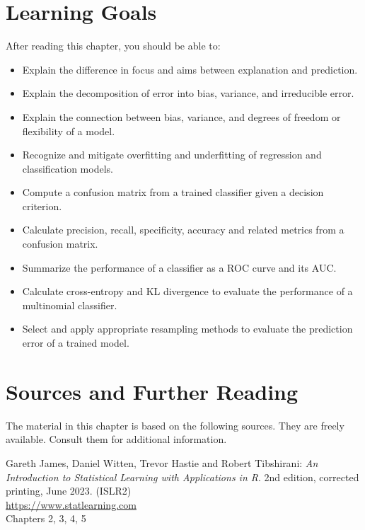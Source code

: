 %
%
\section*{Learning Goals}

After reading this chapter, you should be able to:
\begin{itemize}
   \item Explain the difference in focus and aims between explanation and prediction.
   \item Explain the decomposition of error into bias, variance, and irreducible error.
   \item Explain the connection between bias, variance, and degrees of freedom or flexibility of a model.
   \item Recognize and mitigate overfitting and underfitting of regression and classification models.
   \item Compute a confusion matrix from a trained classifier given a decision criterion.
   \item Calculate precision, recall, specificity, accuracy and related metrics from a confusion matrix.
   \item Summarize the performance of a classifier as a ROC curve and its AUC.
   \item Calculate cross-entropy and KL divergence to evaluate the performance of a multinomial classifier.
   \item Select and apply appropriate resampling methods to evaluate the prediction error of a trained model.
\end{itemize}

\section*{Sources and Further Reading}

The material in this chapter is based on the following sources. They are freely available. Consult them for additional information.

\begin{tcolorbox}[colback=alert]
Gareth James, Daniel Witten, Trevor Hastie and Robert Tibshirani: \emph{An Introduction to Statistical Learning with Applications in R}. 2nd edition, corrected printing, June 2023. (ISLR2) \\

\url{https://www.statlearning.com} \\

Chapters 2, 3, 4, 5
\end{tcolorbox}

